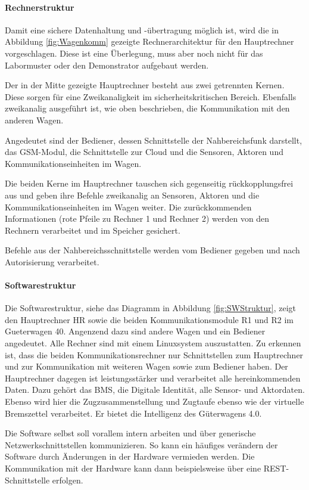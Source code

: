 \paragraph{Rechnerstruktur}
Damit eine sichere Datenhaltung und -übertragung möglich ist, wird die in Abbildung \ref{fig:Wagenkomm} gezeigte Rechnerarchitektur für den Hauptrechner vorgeschlagen. Diese ist eine Überlegung, muss aber noch nicht für das Labormuster oder den Demonstrator aufgebaut werden.\par
Der in der Mitte gezeigte Hauptrechner besteht aus zwei getrennten Kernen. Diese sorgen für eine Zweikanaligkeit im sicherheitskritischen Bereich. Ebenfalls zweikanalig ausgeführt ist, wie oben beschrieben, die Kommunikation mit den anderen Wagen.\par
Angedeutet sind der Bediener, dessen Schnittstelle der Nahbereichsfunk darstellt, das GSM-Modul, die Schnittstelle zur Cloud und die Sensoren, Aktoren und Kommunikationseinheiten im Wagen.\par
Die beiden Kerne im Hauptrechner tauschen sich gegenseitig rückkopplungsfrei aus und geben ihre Befehle zweikanalig an Sensoren, Aktoren und die Kommunikationseinheiten im Wagen weiter. Die zurückkommenden Informationen (rote Pfeile zu Rechner 1 und Rechner 2) werden von den Rechnern verarbeitet und im Speicher gesichert.\par
Befehle aus der Nahbereichsschnittstelle werden vom Bediener gegeben und nach Autorisierung verarbeitet. \par

\paragraph{Softwarestruktur}
Die Softwarestruktur, siehe das Diagramm in Abbildung \ref{fig:SWStruktur}, zeigt den Hauptrechner HR sowie die beiden Kommunikationsmodule R1 und R2 im \gls{Gueterwagen 40}. Angenzend dazu sind andere Wagen und ein Bediener angedeutet.
Alle Rechner sind mit einem Linuxsystem auszustatten. Zu erkennen ist, dass die beiden Kommunikationsrechner nur Schnittstellen zum Hauptrechner und zur Kommunikation mit weiteren Wagen sowie zum Bediener haben. Der Hauptrechner dagegen ist leistungsstärker und verarbeitet alle hereinkommenden Daten. Dazu gehört das BMS, die Digitale Identität, alle Sensor- und Aktordaten. Ebenso wird hier die Zugzusammenstellung und Zugtaufe ebenso wie der virtuelle Bremszettel verarbeitet. Er bietet die Intelligenz des Güterwagens 4.0.\par
Die Software selbst soll vorallem intern arbeiten und über generische Netzwerkschnittstellen kommunizieren. So kann ein häufiges verändern der Software durch Änderungen in der Hardware vermieden werden. Die Kommunikation mit der Hardware kann dann beispielsweise über eine REST-Schnittstelle erfolgen.

